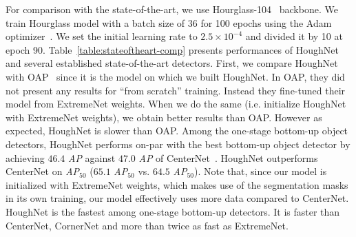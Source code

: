 \documentclass[runningheads]{llncs}
\begin{document}
For comparison with the state-of-the-art, we use Hourglass-104~\cite{cornernet} backbone. We train Hourglass model with a batch size of 36 for 100 epochs using the Adam optimizer~\cite{adam}. We set the initial learning rate to  $2.5 \times 10^{-4}$ and divided  it by  10 at epoch 90.  Table~\ref{table:stateoftheart-comp} presents performances of HoughNet and several established state-of-the-art detectors. First,  we compare HoughNet with OAP~\cite{centernet} since it is the model on which we built HoughNet. In OAP, they did not present any results for “from scratch” training.  Instead they fine-tuned their model from ExtremeNet weights. When we do the same (i.e. initialize HoughNet with ExtremeNet weights), we obtain better results than OAP. However as expected, HoughNet is slower than OAP. Among the one-stage bottom-up object detectors, HoughNet performs on-par with the best bottom-up object detector by achieving $46.4$ \textit{AP} against $47.0$ \textit{AP} of CenterNet~\cite{centernet2}. HoughNet outperforms CenterNet on \textit{AP$_{50}$} ($65.1$ \textit{AP$_{50}$} vs. $64.5$ \textit{AP$_{50}$}). Note that, since our model is initialized with ExtremeNet weights, which makes use of the segmentation masks in its own training, our model  effectively uses more data compared to CenterNet. HoughNet is the fastest among one-stage bottom-up detectors. It is faster than CenterNet, CornerNet and more than twice as fast as ExtremeNet.
\end{document}
